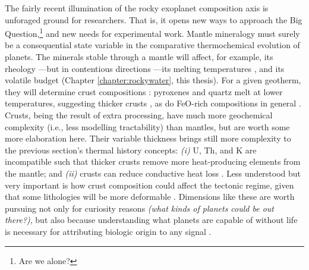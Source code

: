 The fairly recent illumination of the rocky exoplanet composition axis is unforaged ground for researchers. That is, it opens new ways to approach the Big Question,\footnote{Are we alone?} and new needs for experimental work. Mantle mineralogy must surely be a consequential %
state variable in the comparative thermochemical evolution of planets. The minerals stable through a mantle will affect, for example, its rheology \citep[e.g.,][]{spaargaren_influence_2020}---but in contentious directions \citep[ferropericlase may be stronger or weaker than bridgmanite; cf.][]{yamazaki_mineral_2001, cordier_periclase_2023}---its melting temperatures \citep[alkalis, Fe, and higher Ca/Al ratios depress the solidus;][]{hirschmann_mantle_2000, kiefer_effects_2015, brugman_experimental_2021}, and its volatile budget (Chapter \ref{chapter:rockywater}, this thesis). For a given geotherm, they will determine crust compositions \citep[e.g.,][]{fortin_volcanic_2022}: pyroxenes and quartz melt at lower temperatures, suggesting thicker crusts \citep{lambart_role_2016}, as do FeO-rich compositions in general \citep{dyck_effect_2021, wade_divergent_2017}. Crusts, being the result of extra processing, have much more geochemical complexity (i.e., less modelling tractability) than mantles, but are worth some more elaboration here. Their variable thickness brings still more complexity to the previous section's thermal history concepts: \textit{(i)} U, Th, and K are incompatible such that thicker crusts remove more heat-producing elements from the mantle; and \textit{(ii)} crusts can reduce conductive heat loss \citep{lenardic_continental_2005, lenardic_note_2011}. Less understood but very important is how crust composition could affect the tectonic regime, given that some lithologies will be more deformable \citep[lower yield stress to plate formation; e.g.,][]{karato_remarks_2014, weller_evolution_2018, ballmer_diversity_2021}. %
Dimensions like these are worth pursuing not only for curiosity reasons  \textit{(what kinds of planets could be out there?)}, but also because understanding what planets are capable of without life is necessary for attributing biologic origin to any signal \citep{wordsworth_redox_2018, lisse_geologically_2020, krissansen-totton_oxygen_2021, krissansen-totton_understanding_2022, butkus_note_2023}.




